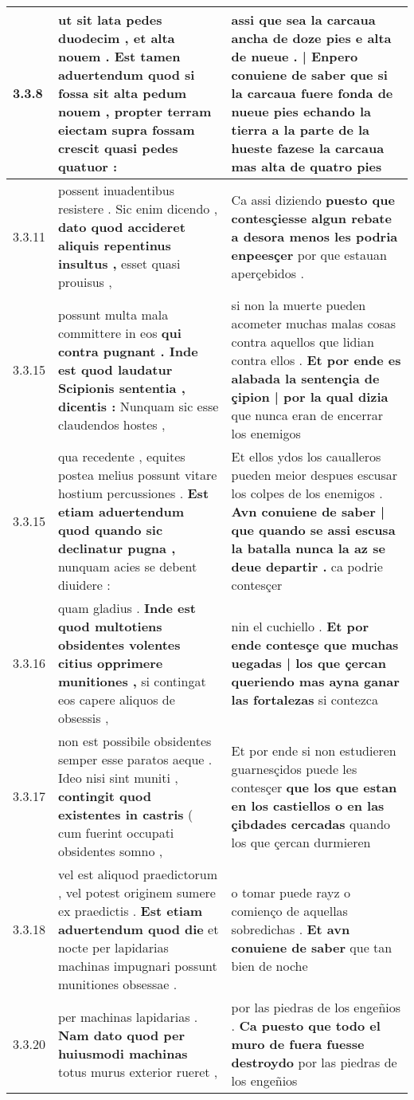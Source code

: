 \begin{tabular}{|p{1cm}|p{6.5cm}|p{6.5cm}|}
3.3.8 & ut sit lata pedes duodecim , \textbf{ et alta nouem . Est tamen aduertendum quod si fossa sit alta pedum nouem , propter terram eiectam supra fossam crescit } quasi pedes quatuor : & assi que sea la carcaua ancha de doze pies \textbf{ e alta de nueue . | Enpero conuiene de saber } que si la carcaua fuere fonda de nueue pies echando la tierra a la parte de la hueste fazese la carcaua mas alta de quatro pies \\\hline
3.3.11 & possent inuadentibus resistere . Sic enim dicendo , \textbf{ dato quod accideret aliquis repentinus insultus , } esset quasi prouisus , & Ca assi diziendo \textbf{ puesto que contesçiesse algun rebate a desora menos les podria enpeesçer } por que estauan aperçebidos . \\\hline
3.3.15 & possunt multa mala committere in eos \textbf{ qui contra pugnant . Inde est quod laudatur Scipionis sententia , dicentis : } Nunquam sic esse claudendos hostes , & si non la muerte pueden acometer muchas malas cosas contra aquellos que lidian contra ellos . \textbf{ Et por ende es alabada la sentençia de çipion | por la qual dizia } que nunca eran de encerrar los enemigos \\\hline
3.3.15 & qua recedente , equites postea melius possunt vitare hostium percussiones . \textbf{ Est etiam aduertendum quod quando sic declinatur pugna , } nunquam acies se debent diuidere : & Et ellos ydos los caualleros pueden meior despues escusar los colpes de los enemigos . \textbf{ Avn conuiene de saber | que quando se assi escusa la batalla nunca la az se deue departir . } ca podrie contesçer \\\hline
3.3.16 & quam gladius . \textbf{ Inde est quod multotiens obsidentes volentes citius opprimere munitiones , } si contingat eos capere aliquos de obsessis , & nin el cuchiello . \textbf{ Et por ende contesçe que muchas uegadas | los que çercan queriendo mas ayna ganar las fortalezas } si contezca \\\hline
3.3.17 & non est possibile obsidentes semper esse paratos aeque . Ideo nisi sint muniti , \textbf{ contingit quod existentes in castris } ( cum fuerint occupati obsidentes somno , & Et por ende si non estudieren guarnesçidos puede les contesçer \textbf{ que los que estan en los castiellos o en las çibdades cercadas } quando los que çercan durmieren \\\hline
3.3.18 & vel est aliquod praedictorum , vel potest originem sumere ex praedictis . \textbf{ Est etiam aduertendum quod die } et nocte per lapidarias machinas impugnari possunt munitiones obsessae . & o tomar puede rayz o comienço de aquellas sobredichas . \textbf{ Et avn conuiene de saber } que tan bien de noche \\\hline
3.3.20 & per machinas lapidarias . \textbf{ Nam dato quod per huiusmodi machinas } totus murus exterior rueret , & por las piedras de los engeñios . \textbf{ Ca puesto que todo el muro de fuera fuesse destroydo } por las piedras de los engeñios \\\hline

\end{tabular}
